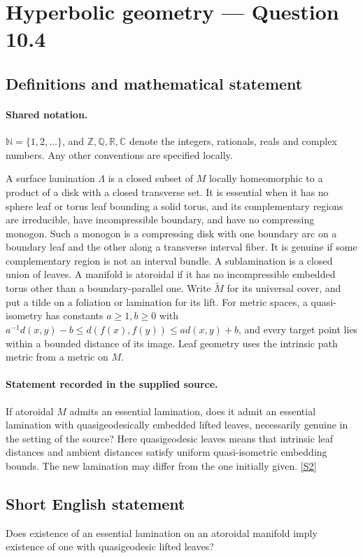 \documentclass[11pt]{article}
\newcommand{\sref}[2]{\hyperlink{source:#1:#2}{[S#2]}}
\begin{document}
\section{Hyperbolic geometry — Question 10.4}\label{statement}

\subsection{Definitions and mathematical statement}

\paragraph{Shared notation.}$\mathbb N=\{1,2,\ldots\}$, and $\mathbb Z,\mathbb Q,\mathbb R,\mathbb C$ denote the integers, rationals, reals and complex numbers. Any other conventions are specified locally.


A surface lamination $\Lambda$ is a closed subset of $M$ locally homeomorphic to a product of a disk with a closed transverse set. It is essential when it has no sphere leaf or torus leaf bounding a solid torus, and its complementary regions are irreducible, have incompressible boundary, and have no compressing monogon. Such a monogon is a compressing disk with one boundary arc on a boundary leaf and the other along a transverse interval fiber. It is genuine if some complementary region is not an interval bundle. A sublamination is a closed union of leaves. A manifold is atoroidal if it has no incompressible embedded torus other than a boundary-parallel one. Write $\widetilde M$ for its universal cover, and put a tilde on a foliation or lamination for its lift. For metric spaces, a quasi-isometry has constants $a\ge1,b\ge0$ with $a^{-1}d(x,y)-b\le d(f(x),f(y))\le a d(x,y)+b$, and every target point lies within a bounded distance of its image. Leaf geometry uses the intrinsic path metric from a metric on $M$.
\paragraph{Statement recorded in the supplied source.}
If atoroidal $M$ admits an essential lamination, does it admit an essential lamination with quasigeodesically embedded lifted leaves, necessarily genuine in the setting of the source? Here quasigeodesic leaves means that intrinsic leaf distances and ambient distances satisfy uniform quasi-isometric embedding bounds. The new lamination may differ from the one initially given. \sref{statement}{2}
\subsection{Short English statement}
Does existence of an essential lamination on an atoroidal manifold imply existence of one with quasigeodesic lifted leaves?
\end{document}
